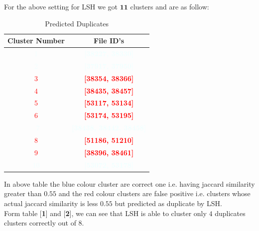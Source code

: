 \documentclass[12pt, a4paper,twoside]{article}
\begin{document}
For the above setting for LSH we got $\bm{11}$ clusters and are as follow:
\begin{table}[H] 
\label{table2}
\begin{center}
\caption{Predicted Duplicates}
\begin{tabular}{|c|c|}
\hline
Cluster Number & File ID's \\
\hline
\textcolor{azure}{1}             & \textcolor{azure}{\textbf{[38227, 38330]}} \\
\textcolor{azure}{2}             & \textcolor{azure}{\textbf{[37917, 37950]}} \\
\textcolor{red}{3}               & \textcolor{red}{\textbf{[38354, 38366]}} \\
\textcolor{red}{4}               & \textcolor{red}{\textbf{[38435, 38457]}} \\
\textcolor{red}{5}               & \textcolor{red}{\textbf{[53117, 53134]}} \\
\textcolor{red}{6}               & \textcolor{red}{\textbf{[53174, 53195]}}\\\
\textcolor{azure}{7 }            & \textcolor{azure}{\textbf{[38438, 38442, 38458]}} \\
\textcolor{red}{8}               & \textcolor{red}{\textbf{[51186, 51210]}} \\
\textcolor{red}{9}               & \textcolor{red}{\textbf{[38396, 38461]}} \\
\textcolor{azure}{10}            & \textcolor{azure}{\textbf{[53072, 53178]}} \\
\hline
\end{tabular}
\end{center}
\end{table}

In above table the blue colour cluster are correct one i.e. having jaccard similarity greater than $0.55$ and the red colour clusters are false positive i.e. clusters whose actual jaccard similarity is less $0.55$ but predicted as duplicate by LSH. \\
Form table [\textbf{1}] and [\textbf{2}], we can see that LSH is able to cluster only $4$ duplicates clusters correctly out of $8$. \\
\end{document}
